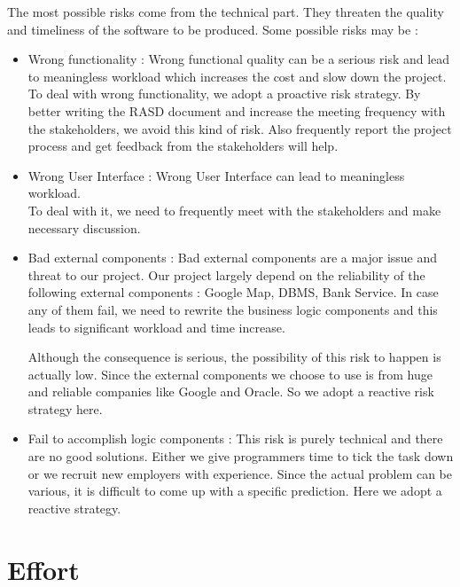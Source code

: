 \documentclass{article}
\begin{document}
The most possible risks come from the technical part. They threaten the quality and timeliness of the software to be produced. Some possible risks may be :
\begin{itemize}
	\item Wrong functionality : Wrong functional quality can be a serious risk and lead to meaningless workload which increases the cost and slow down the project.\\
	To deal with wrong functionality, we adopt a proactive risk strategy. By better writing the RASD document and increase the meeting frequency with the stakeholders, we avoid this kind of risk. Also frequently report the project process and get feedback  from the stakeholders will help. 
	
	\item Wrong User Interface : Wrong User Interface can lead to meaningless workload. \\
	To deal with it, we need to frequently meet with the stakeholders and make necessary discussion.
	
	\item Bad external components : Bad external components are a major issue and threat to our project. Our project largely depend on the reliability of the following external components : Google Map, DBMS, Bank Service. In case any of them fail, we need to rewrite the business logic components and this leads to significant workload and time increase.
	
	Although the consequence is serious, the possibility of this risk to happen is actually low. Since the external components we choose to use is from huge and reliable companies like Google and Oracle. So we adopt a reactive risk strategy here. 
	
	\item Fail to accomplish logic components : This risk is purely technical and there are no good solutions. Either we give programmers time to tick the task down or we recruit new employers with experience. Since the actual problem can be various, it is difficult to come up with a specific  prediction. Here we adopt a reactive strategy.
\end{itemize}
\newpage

\section{Effort}
\end{document}
